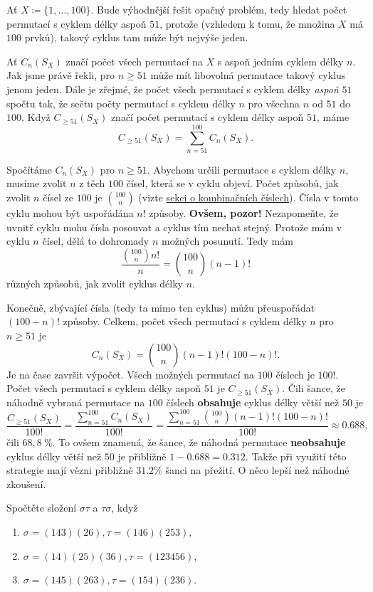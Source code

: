 Ať $X \coloneqq \{1,\ldots,100\}$. Bude výhodnější řešit opačný problém, tedy
hledat počet permutací s cyklem délky aspoň $51$, protože (vzhledem k tomu, že
množina $X$ má $100$ prvků), takový cyklus tam může být nejvýše jeden.

Ať $C_n(S_X)$ značí počet všech permutací na $X$ s aspoň jedním cyklem délky
$n$. Jak jsme právě řekli, pro $n \geq 51$ může mít libovolná permutace takový
cyklus jenom jeden. Dále je zřejmé, že počet všech permutací s cyklem délky
\emph{aspoň} $51$ spočtu tak, že sečtu počty permutací s cyklem délky $n$ pro
všechna $n$ od $51$ do $100$. Když $C_{ \geq 51}(S_X)$ značí počet permutací s
cyklem délky aspoň $51$, máme
\[
 C_{ \geq 51}(S_X) = \sum_{n=51}^{100} C_n(S_X). 
\]

Spočítáme $C_n(S_X)$ pro $n \geq 51$. Abychom určili permutace s cyklem délky
$n$, musíme zvolit $n$ z těch $100$ čísel, která se v cyklu objeví. Počet
způsobů, jak zvolit $n$ čísel ze $100$ je $\binom{100}{n}$ (vizte
\hyperref[ssec:kombinacni-cisla]{sekci o
kombinačních číslech}).
Čísla v tomto cyklu mohou být uspořádána $n!$ způsoby. \textbf{Ovšem, pozor!}
Nezapomeňte, že uvnitř cyklu mohu čísla posouvat a cyklus tím nechat stejný.
Protože mám v cyklu $n$ čísel, dělá to dohromady $n$ možných posunutí. Tedy mám
\[
 \frac{\binom{100}{n}n!}{n} = \binom{100}{n}(n-1)!
\]
různých způsobů, jak zvolit cyklus délky $n$.

Konečně, zbývající čísla (tedy ta mimo ten cyklus) můžu přeuspořádat $(100-n)!$
způsoby. Celkem, počet všech permutací s cyklem délky $n$ pro $n \geq 51$ je
\[
 C_n(S_X) = \binom{100}{n}(n-1)!(100-n)!.
\]
Je na čase završit výpočet. Všech možných permutací na $100$ číslech je $100!$.
Počet všech permutací s cyklem délky aspoň $51$ je $C_{\geq 51}(S_X)$. Čili šance,
že náhodně vybraná permutace na $100$ číslech \textbf{obsahuje} cyklus délky
větší než $50$ je
\[
 \frac{C_{ \geq 51}(S_X)}{100!} = \frac{\sum_{n=51}^{100} C_n(S_X)}{100!} =
 \frac{\sum_{n=51}^{100} \binom{100}{n}(n-1)!(100-n)!}{100!} \approx 0.688,
\]
čili $68,8~\%$. To ovšem znamená, že šance, že náhodná permutace
\textbf{neobsahuje} cyklus délky větší než $50$ je přibližně $1 - 0.688 =
0.312$. Takže při využití této strategie mají vězni přibližně $31.2\%$ šanci na
přežití. O něco lepší než náhodné zkoušení.

\begin{exercise}
 Spočtěte složení $\sigma\tau$ a $\tau\sigma$, když
 \begin{enumerate}[topsep=0pt,label=(\arabic*)]
  \item $\sigma = (143)(26), \tau = (146)(253)$,
  \item $\sigma = (14)(25)(36), \tau = (123456)$,
  \item $\sigma = (145)(263), \tau = (154)(236)$.
 \end{enumerate}
\end{exercise}

